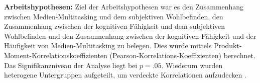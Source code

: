 \par
\textbf{Arbeitshypothesen:} Ziel der Arbeitshypothesen war es den Zusammenhang zwischen Medien-Multitasking und dem subjektiven Wohlbefinden, den Zusammenhang zwischen der kognitiven Fähigkeit und dem subjektiven Wohlbefinden und den Zusammenhang zwischen der kognitiven Fähigkeit und der Häufigkeit von Medien-Multitasking zu belegen. Dies wurde mittels Produkt-Moment-Korrelationskoeffizienten (Pearson-Korrelations-Koeffizienten) berechnet. Das Signifikanzniveau der Analyse liegt bei $p=.05$. Wiederum wurden heterogene Untergruppen aufgeteilt, um verdeckte Korrelationen aufzudecken \cite{Ebermann2014}.







